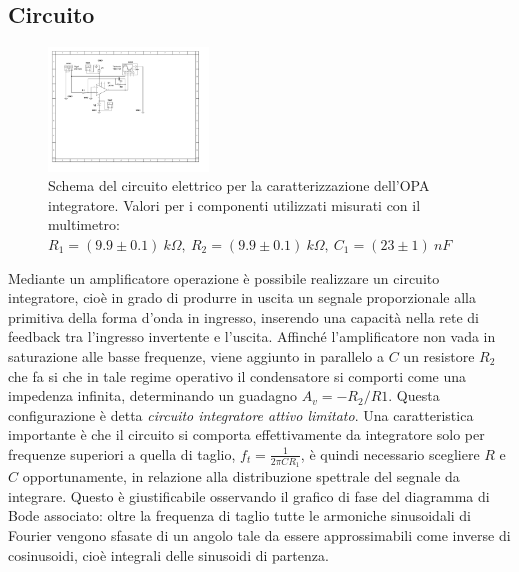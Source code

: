 \documentclass[journal]{IEEEtran}
\begin{document}
\subsection{\textbf{Circuito}}
\begin{figure}[H]%
\begin{center}
\includegraphics[width=0.38\textwidth]{sch-simulations/output/OPA-integratore.pdf}
\caption{Schema  del  circuito  elettrico  per  la  caratterizzazione  dell’OPA integratore.  Valori  per  i  componenti  utilizzati  misurati  con il multimetro: $R_1 = (9.9 \pm 0.1)\ k\Omega, \ R_2 = (9.9 \pm 0.1) \ k\Omega,\ C_1 = (23 \pm 1)\ nF$}
\label{fig:OPA-integ}
\end{center}
\end{figure}
Mediante un amplificatore operazione è possibile realizzare un circuito integratore, cioè in grado di produrre in uscita un segnale proporzionale alla primitiva della forma d'onda in ingresso, inserendo una capacità nella rete di feedback tra l'ingresso invertente e l'uscita.
Affinché l'amplificatore non vada in saturazione alle basse frequenze, viene aggiunto in parallelo a $C$ un resistore $R_{2}$ che fa si che in tale regime operativo il condensatore si comporti come una impedenza infinita, determinando un guadagno $A_{v}=-R_{2}/R{1}$. Questa configurazione è detta \textit{circuito integratore attivo limitato}. 
Una caratteristica importante è che il circuito si comporta effettivamente da integratore solo per frequenze superiori a quella di taglio, $f_{t}=\frac{1}{2 \pi C R_{1} }$, è quindi necessario scegliere $R$ e $C$ opportunamente, in relazione alla distribuzione spettrale del segnale da integrare. Questo è giustificabile osservando il grafico di fase del diagramma di Bode associato: oltre la frequenza di taglio tutte le armoniche sinusoidali di Fourier vengono sfasate di un angolo tale da essere approssimabili come inverse di cosinusoidi, cioè integrali delle sinusoidi di partenza.
\end{document}
